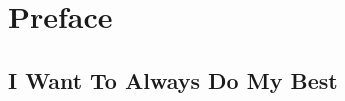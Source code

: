 
\setcounter{footnote}{0}
\setcounter{endnote}{0}

\chapter{Preface}
\section*{I Want To Always Do My Best}
\par 

\theendnotes